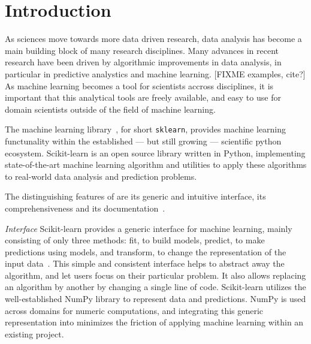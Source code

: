 




\setcounter{section}{0}
\section{Introduction}
As sciences move towards more data driven research, data analysis has
become a main building block of many research disciplines.
Many advances in recent research have been driven by algorithmic improvements
in data analysis, in particular in predictive analystics and machine learning.
[FIXME examples, cite?]
As machine learning becomes a tool for scientists accross disciplines, it is
important that this analytical tools are freely available, and easy to use for
domain scientists outside of the field of machine learning.


The \sklearn{} machine learning library~\autocite{pedregosa2011scikit}, for short \texttt{sklearn}, provides machine learning functunality
within the established --- but still growing --- scientific python ecosystem.
Scikit-learn is an open source library written in Python, implementing state-of-the-art
machine learning algorithm and utilities to apply these algorithms to real-world
data analysis and prediction problems.

The distinguishing features of \sklearn{} are its generic and intuitive
interface, its comprehensiveness and its documentation~\autocite{Varoquaux:2015:SML:2786984.2786995}.

\emph{Interface} Scikit-learn provides a generic interface for machine learning, mainly consisting
of only three methods: fit, to build models, predict, to make predictions using models,
and transform, to change the representation of the input data~\autocite{buitinck2013api}.
This simple and consistent interface helps to abstract away the algorithm, and let
users focus on their particular problem. It also allows replacing an algorithm by another
by changing a single line of code.
Scikit-learn utilizes the well-established NumPy library to represent data and predictions.
NumPy is used across domains for numeric computations, and integrating this generic
representation into \sklearn{} minimizes the friction of applying machine learning
within an existing project.

